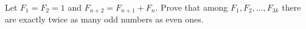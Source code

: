 Let $F_1=F_2=1$ and $F_{n+2}=F_{n+1}+F_n$. Prove that among $F_1,F_2,\dots,F_{3k}$ there are exactly twice as many odd numbers as even ones.
